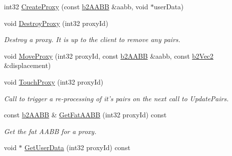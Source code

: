 \begin{DoxyCompactItemize}
\item 
int32 \hyperlink{classb2_broad_phase_ae2f7af756bc55ece45221466c5af449c}{Create\-Proxy} (const \hyperlink{structb2_a_a_b_b}{b2\-A\-A\-B\-B} \&aabb, void $\ast$user\-Data)
\item 
\hypertarget{classb2_broad_phase_a84f0fb227dc01a9b9baa55c7b8c68984}{void \hyperlink{classb2_broad_phase_a84f0fb227dc01a9b9baa55c7b8c68984}{Destroy\-Proxy} (int32 proxy\-Id)}\label{classb2_broad_phase_a84f0fb227dc01a9b9baa55c7b8c68984}

\begin{DoxyCompactList}\small\item\em Destroy a proxy. It is up to the client to remove any pairs. \end{DoxyCompactList}\item 
void \hyperlink{classb2_broad_phase_a01dc18a19c2b5d0cc1d9cd8c8554234c}{Move\-Proxy} (int32 proxy\-Id, const \hyperlink{structb2_a_a_b_b}{b2\-A\-A\-B\-B} \&aabb, const \hyperlink{structb2_vec2}{b2\-Vec2} \&displacement)
\item 
\hypertarget{classb2_broad_phase_a67b296431ebbc7b44037f21d645d9166}{void \hyperlink{classb2_broad_phase_a67b296431ebbc7b44037f21d645d9166}{Touch\-Proxy} (int32 proxy\-Id)}\label{classb2_broad_phase_a67b296431ebbc7b44037f21d645d9166}

\begin{DoxyCompactList}\small\item\em Call to trigger a re-\/processing of it's pairs on the next call to Update\-Pairs. \end{DoxyCompactList}\item 
\hypertarget{classb2_broad_phase_a7b00ac700db52e52248a25397007d4ff}{const \hyperlink{structb2_a_a_b_b}{b2\-A\-A\-B\-B} \& \hyperlink{classb2_broad_phase_a7b00ac700db52e52248a25397007d4ff}{Get\-Fat\-A\-A\-B\-B} (int32 proxy\-Id) const }\label{classb2_broad_phase_a7b00ac700db52e52248a25397007d4ff}

\begin{DoxyCompactList}\small\item\em Get the fat A\-A\-B\-B for a proxy. \end{DoxyCompactList}\item 
\hypertarget{classb2_broad_phase_a89c099e95237d68577376d8f9a4ed013}{void $\ast$ \hyperlink{classb2_broad_phase_a89c099e95237d68577376d8f9a4ed013}{Get\-User\-Data} (int32 proxy\-Id) const }\label{classb2_broad_phase_a89c099e95237d68577376d8f9a4ed013}


\end{DoxyCompactItemize}
